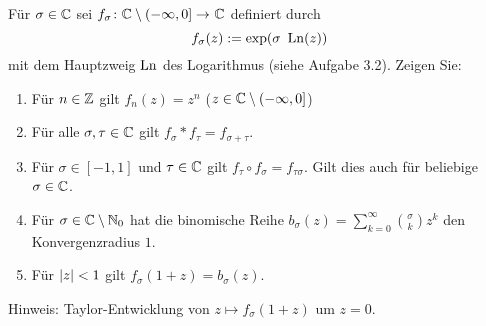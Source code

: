 \begin{exercisePage}
	\begin{task}
		Für $\sigma \in \mathbb{C}$ sei $\abb{f_\sigma}{\CC \setminus (- \infty, 0]}{\CC}$ definiert durch
		\begin{equation*}
			f_\sigma(z) \mathrel{:=} \exp(\sigma \ \operatorname{Ln}(z))
		\end{equation*}
		mit dem Hauptzweig $\operatorname{Ln}$ des Logarithmus (siehe Aufgabe 3.2). Zeigen Sie:
		\begin{enumerate}
			\item Für $n \in \mathbb{Z}$ gilt $f_n(z) = z^n$ ($z \in \mathbb{C} \setminus (-\infty, 0]$)
			\item Für alle $\sigma, \tau \in \mathbb{C}$ gilt $f_\sigma * f_\tau = f_{\sigma + \tau}$.
			\item Für $\sigma \in [-1,1]$ und $\tau \in \mathbb{C}$ gilt $f_\tau \circ f_\sigma = f_{\tau \sigma}$. Gilt dies auch für beliebige $\sigma \in \mathbb{C}$.
			\item Für $\sigma \in \mathbb{C} \setminus \mathbb{N}_0$ hat die binomische Reihe $b_\sigma(z) = \sum_{k=0}^{\infty} \binom{\sigma}{k} z^k$ den Konvergenzradius $1$.
			\item Für $\left| z \right| < 1$ gilt $f_\sigma(1+z) = b_\sigma(z)$.			
		\end{enumerate}
		Hinweis: Taylor-Entwicklung von $z \mapsto f_\sigma(1+z)$ um $z=0$.
	\end{task}


\end{exercisePage}
